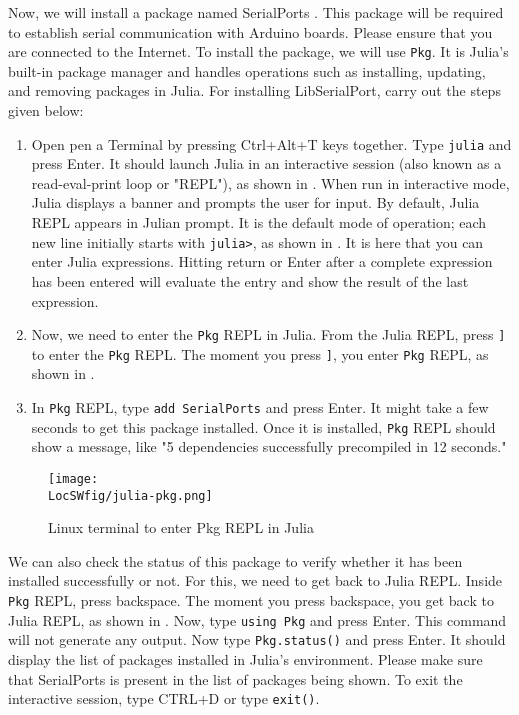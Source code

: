 Now, we will install a package named SerialPorts \cite{julia-serial-ports}. This package will be required to 
establish serial communication with Arduino boards. Please ensure that you 
are connected to the Internet. To install the package,  
we will use {\tt Pkg}. It is Julia's built-in package manager and 
handles operations such as installing, updating, and removing packages in Julia. 
For installing LibSerialPort, carry out the steps given below:
\begin{enumerate}
      \item Open pen a Terminal by pressing Ctrl+Alt+T keys together. Type {\tt julia} and press Enter.
      It should launch Julia in an interactive session (also known as a read-eval-print loop or "REPL"), as shown 
      in . When run in interactive mode, Julia displays a banner and 
      prompts the user for input. By default, Julia REPL appears in Julian prompt. It is the default mode of 
      operation; each new line initially starts with {\tt julia>}, as 
      shown in . It is here that you can enter Julia expressions. 
      Hitting return or Enter after a complete expression has been entered will evaluate 
      the entry and show the result of the last expression.  
      \item Now, we need to enter the {\tt Pkg} REPL in Julia. From the Julia REPL, 
            press {\tt ]} to enter the {\tt Pkg} REPL. The moment you press 
            {\tt ]}, you enter {\tt Pkg} REPL, as shown in . 
      \item In {\tt Pkg} REPL, type {\tt add SerialPorts} and press Enter. It might take a few seconds  
            to get this package installed. Once it is installed, {\tt Pkg} REPL should show a message,
            like "5 dependencies successfully precompiled in 12 seconds." 
\end{enumerate}

\begin{figure}
      \centering
      \texttt{[image: \\LocSWfig/julia-pkg.png]}
      \caption{Linux terminal to enter Pkg REPL in Julia}
      \label{julia-pkg}
\end{figure}

We can also check the status of this package to verify whether it has been installed 
successfully or not. For this, we need to get back to Julia REPL. Inside {\tt Pkg}
REPL, press backspace. The moment you press backspace, you get back to Julia REPL, as shown in 
. Now, type {\tt using Pkg} and press Enter. This command will not 
generate any output. Now type {\tt Pkg.status()} and press Enter. It should display the 
list of packages installed in Julia's environment. Please make sure that SerialPorts 
is present in the list of packages being shown. To exit the interactive session, type CTRL+D or type {\tt exit()}. 


